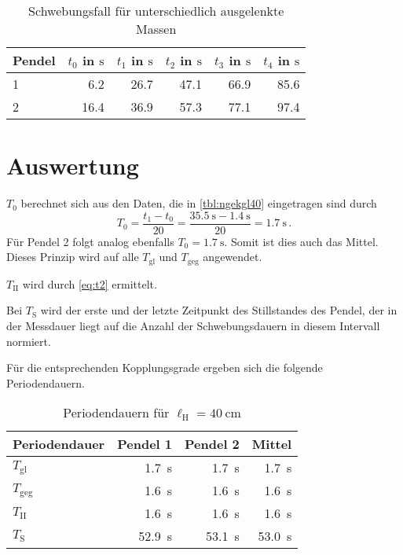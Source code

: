 \documentclass[
12pt,
a4paper,
bibliography=totocnumbered, %
BCOR=1cm, %
oneside, %
]{scrartcl}
\newcommand{\lh}{\ell_{\mathrm{H}}}
\begin{document}
\begin{table}[H]
		\caption{Schwebungsfall für unterschiedlich ausgelenkte Massen \label{tbl:schwebX70}}
	\begin{tabular*}{\textwidth}{@{\extracolsep{\fill}}@{\hspace{5pt}}lrrrrr@{\hspace{5pt}}}
		\toprule
		Pendel & \(t_0\) in \(\si{\second}\) & \(t_1\) in \(\si{\second}\)& \(t_2\) in \(\si{\second}\)& \(t_3\) in \(\si{\second}\)& \(t_4\) in \(\si{\second}\)\\
		\midrule
		1 & \num{6,2}   & \num{26,7} & \num{47,1} & \num{66,9} & \num{85,6}\\
		2 & \num{16,4}   & \num{36,9} & \num{57,3} & \num{77,1} & \num{97,4}\\
		\bottomrule
	\end{tabular*}
\end{table}

\section{Auswertung}

\(T_0\) berechnet sich aus den Daten, die in \autoref{tbl:ngekgl40} eingetragen sind durch
\begin{equation*}
	T_0 = \frac{t_1 - t_0}{20} = \frac{\qty{35,5}{\second} - \qty{1,4}{\second}}{20} = \qty{1,7}{\second} \,.
\end{equation*}
Für Pendel \num{2} folgt analog ebenfalls \(T_0 =\qty{1,7}{\second}\). Somit ist dies auch das Mittel. Dieses Prinzip wird auf alle \(T_{\text{gl}}\) und \(T_{\text{geg}}\) angewendet.

\(T_{\text{II}}\) wird durch \autoref{eq:t2} ermittelt. %

Bei \(T_{\text{S}}\) wird der erste und der letzte Zeitpunkt des Stillstandes des Pendel, der in der Messdauer liegt auf die Anzahl der Schwebungsdauern in diesem Intervall normiert. %

Für die entsprechenden Kopplungsgrade ergeben sich die folgende Periodendauern.

\begin{table}[H]
		\caption{Periodendauern für \(\lh = \qty{40}{\centi\meter}\) \label{tbl:res40}}
	\begin{tabular*}{\textwidth}{@{\extracolsep{\fill}}@{\hspace{5pt}}lrrr@{\hspace{5pt}}}
		\toprule
		Periodendauer & Pendel 1 & Pendel 2 & Mittel\\
		\midrule
		\(T_{\text{gl}}\) & \qty{1,7}{\second} & \qty{1,7}{\second} & \qty{1,7}{\second}\\
		\(T_{\text{geg}}\) & \qty{1,6}{\second} & \qty{1,6}{\second} & \qty{1,6}{\second}\\
		\(T_{\text{II}}\) & \qty{1,6}{\second} & \qty{1,6}{\second} & \qty{1,6}{\second}\\
		\(T_{\text{S}}\) & \qty{52,9}{\second} & \qty{53,1}{\second} & \qty{53,0}{\second} \\
		\bottomrule
	\end{tabular*}
\end{table}
\end{document}
